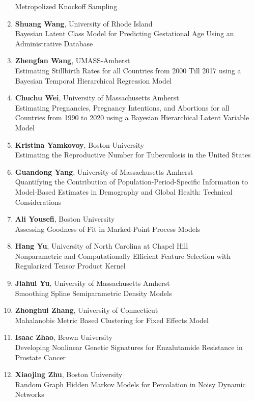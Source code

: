 \begin{enumerate}
Metropolized Knockoff Sampling
\item \textbf{Shuang Wang}, University of Rhode Island \\
Bayesian Latent Class Model for Predicting Gestational Age Using an Administrative Database
\item \textbf{Zhengfan Wang}, UMASS-Amherst \\
Estimating Stillbirth Rates for all Countries from 2000 Till 2017 using a Bayesian Temporal Hierarchical Regression Model
\item \textbf{Chuchu Wei}, University of Massachusetts Amherst \\
Estimating Pregnancies, Pregnancy Intentions, and Abortions for all Countries from 1990 to 2020 using a Bayesian Hierarchical Latent Variable Model
\item \textbf{Kristina Yamkovoy}, Boston University \\
Estimating the Reproductive Number for Tuberculosis in the United States
\item \textbf{Guandong Yang}, University of Massachusetts Amherst \\
Quantifying the Contribution of Population-Period-Specific Information to Model-Based Estimates in Demography and Global Health: Technical Considerations
\item \textbf{Ali Yousefi}, Boston University \\
Assessing Goodness of Fit in Marked-Point Process Models
\item \textbf{Hang Yu}, University of North Carolina at Chapel Hill \\
Nonparametric and Computationally Efficient Feature Selection with Regularized Tensor Product Kernel
\item \textbf{Jiahui Yu}, University of Massachusetts Amherst \\
Smoothing Spline Semiparametric Density Models
\item \textbf{Zhonghui Zhang}, University of Connecticut \\
Mahalanobis Metric Based Clustering for Fixed Effects Model
\item \textbf{Isaac Zhao}, Brown University \\
Developing Nonlinear Genetic Signatures for Enzalutamide Resistance in Prostate Cancer
\item \textbf{Xiaojing Zhu}, Boston University \\
Random Graph Hidden Markov Models for Percolation in Noisy Dynamic Networks
\end{enumerate}

